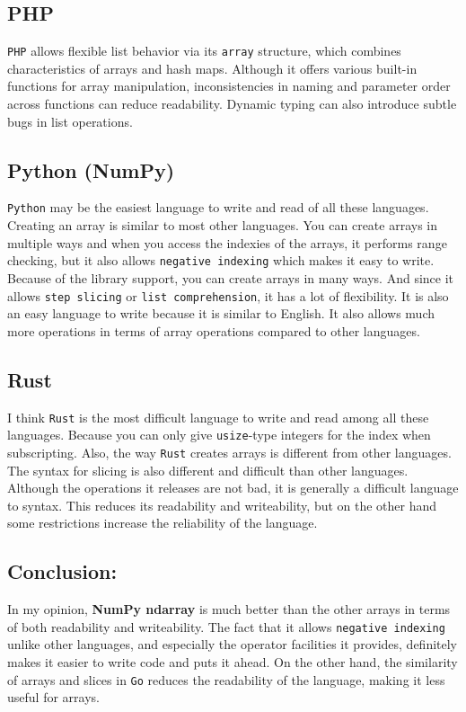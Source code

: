 \documentclass{article}
\begin{document}
\subsection{PHP}
\texttt{PHP} allows flexible list behavior via its \texttt{array} structure, which combines characteristics of arrays and hash maps. Although it offers various built-in functions for array manipulation, inconsistencies in naming and parameter order across functions can reduce readability. Dynamic typing can also introduce subtle bugs in list operations.

\subsection{Python (NumPy)} 
\texttt{Python} may be the easiest language to write and read of all these languages. Creating an array is similar to most other languages. You can create arrays in multiple ways and when you access the indexies of the arrays, it performs range checking, but it also allows \texttt{negative indexing} which makes it easy to write. 
Because of the library support, you can create arrays in many ways. And since it allows \texttt{step slicing} or \texttt{list comprehension}, it has a lot of flexibility. It is also an easy language to write because it is similar to English. It also allows much more operations in terms of array operations compared to other languages.

\subsection{Rust}
I think \texttt{Rust} is the most difficult language to write and read among all these languages. Because you can only give \texttt{usize}-type integers for the index when subscripting. Also, the way \texttt{Rust} creates arrays is different from other languages. The syntax for slicing is also different and difficult than other languages. Although the operations it releases are not bad, it is generally a difficult language to syntax. This reduces its readability and writeability, but on the other hand some restrictions increase the reliability of the language. 

\vspace{10pt}
\subsection{Conclusion:}
In my opinion, \textbf{NumPy ndarray} is much better than the other arrays in terms of both readability and writeability. The fact that it allows \texttt{negative indexing} unlike other languages, and especially the operator facilities it provides, definitely makes it easier to write code and puts it ahead. On the other hand, the similarity of arrays and slices in \texttt{Go} reduces the readability of the language, making it less useful for arrays.
\end{document}
